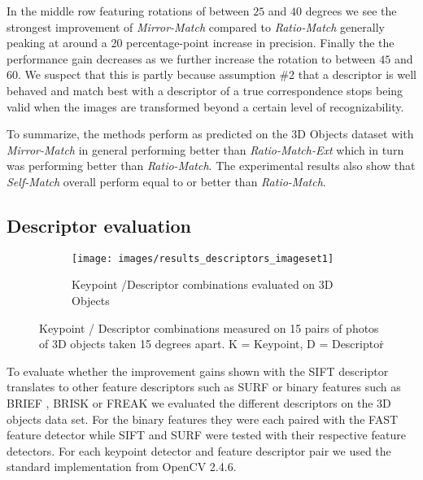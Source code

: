\documentclass[journal]{IEEEtran}
\begin{document}
In the middle row featuring rotations of between $25$ and $40$ degrees 
we see the strongest improvement of \emph{Mirror-Match} compared to 
\emph{Ratio-Match} generally peaking at around
a 20 percentage-point increase in precision. Finally the the performance
gain decreases as we further increase the rotation to between $45$ and 
$60$. We suspect that this is partly because assumption \#2 that a 
descriptor is well behaved and match best with a descriptor of a true 
correspondence stops being valid when the images are transformed beyond 
a certain level of recognizability.

To summarize, the methods perform as predicted on the 3D Objects dataset
with \emph{Mirror-Match} in general performing better than 
\emph{Ratio-Match-Ext} which in turn was performing better than 
\emph{Ratio-Match}. The experimental results also show that 
\emph{Self-Match} overall perform equal to or better than 
\emph{Ratio-Match}.

\subsection{Descriptor evaluation}
\label{label:desc}

\begin{figure*}[t!]
    \begin{subfigure}[t]{1\textwidth}
        \centering
        \texttt{[image: images/results\_descriptors\_imageset1]}
        \caption{Keypoint /Descriptor combinations evaluated on 3D 
        Objects}
        \label{fig:descriptors}
    \end{subfigure}%

    \caption{Keypoint / Descriptor combinations measured on 15 pairs of 
    photos of 3D objects taken 15 degrees apart. K = Keypoint, D = 
Descriptor\.}
\end{figure*}

To evaluate whether the improvement gains shown with the SIFT descriptor 
translates to other feature descriptors such as SURF \cite{bay2006surf} 
or binary features such as BRIEF \cite{calonder2010brief}, BRISK 
\cite{leutenegger2011brisk} or FREAK \cite{alahi2012freak} we evaluated 
the different descriptors on the 3D objects data set.  For the binary 
features they were each paired with the FAST feature detector while SIFT 
and SURF were tested with their respective feature detectors.  For each 
keypoint detector and feature descriptor pair we used the standard 
implementation from OpenCV 2.4.6.
\end{document}

